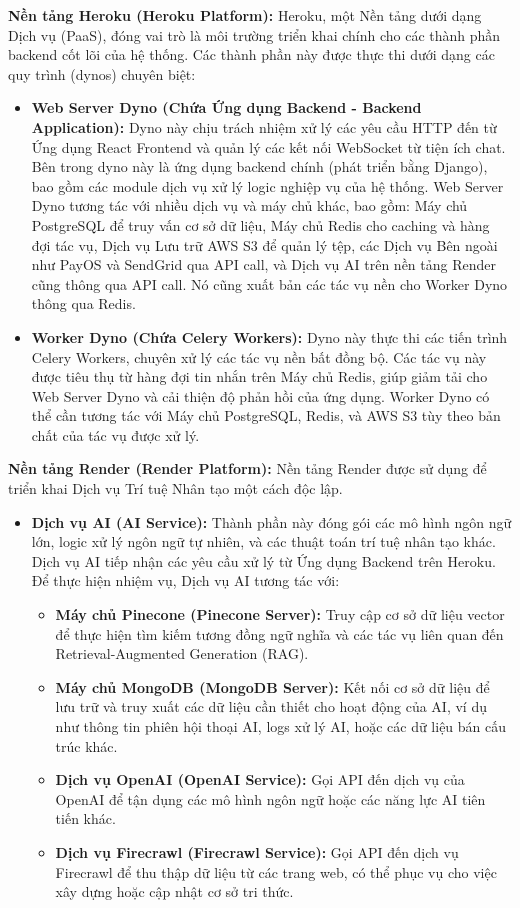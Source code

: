 \textbf{Nền tảng Heroku (Heroku Platform):} Heroku, một Nền tảng dưới dạng Dịch vụ (PaaS), đóng vai trò là môi trường triển khai chính cho các thành phần backend cốt lõi của hệ thống. Các thành phần này được thực thi dưới dạng các quy trình (dynos) chuyên biệt:
\begin{itemize}
    \item \textbf{Web Server Dyno (Chứa Ứng dụng Backend - Backend Application):} Dyno này chịu trách nhiệm xử lý các yêu cầu HTTP đến từ Ứng dụng React Frontend và quản lý các kết nối WebSocket từ tiện ích chat. Bên trong dyno này là ứng dụng backend chính (phát triển bằng Django), bao gồm các module dịch vụ xử lý logic nghiệp vụ của hệ thống. Web Server Dyno tương tác với nhiều dịch vụ và máy chủ khác, bao gồm: Máy chủ PostgreSQL để truy vấn cơ sở dữ liệu, Máy chủ Redis cho caching và hàng đợi tác vụ, Dịch vụ Lưu trữ AWS S3 để quản lý tệp, các Dịch vụ Bên ngoài như PayOS và SendGrid qua API call, và Dịch vụ AI trên nền tảng Render cũng thông qua API call. Nó cũng xuất bản các tác vụ nền cho Worker Dyno thông qua Redis.
    \item \textbf{Worker Dyno (Chứa Celery Workers):} Dyno này thực thi các tiến trình Celery Workers, chuyên xử lý các tác vụ nền bất đồng bộ. Các tác vụ này được tiêu thụ từ hàng đợi tin nhắn trên Máy chủ Redis, giúp giảm tải cho Web Server Dyno và cải thiện độ phản hồi của ứng dụng. Worker Dyno có thể cần tương tác với Máy chủ PostgreSQL, Redis, và AWS S3 tùy theo bản chất của tác vụ được xử lý.
\end{itemize}

\textbf{Nền tảng Render (Render Platform):} Nền tảng Render được sử dụng để triển khai Dịch vụ Trí tuệ Nhân tạo một cách độc lập.
\begin{itemize}
    \item \textbf{Dịch vụ AI (AI Service):} Thành phần này đóng gói các mô hình ngôn ngữ lớn, logic xử lý ngôn ngữ tự nhiên, và các thuật toán trí tuệ nhân tạo khác. Dịch vụ AI tiếp nhận các yêu cầu xử lý từ Ứng dụng Backend trên Heroku. Để thực hiện nhiệm vụ, Dịch vụ AI tương tác với:
        \begin{itemize}
            \item \textbf{Máy chủ Pinecone (Pinecone Server):} Truy cập cơ sở dữ liệu vector để thực hiện tìm kiếm tương đồng ngữ nghĩa và các tác vụ liên quan đến Retrieval-Augmented Generation (RAG).
            \item \textbf{Máy chủ MongoDB (MongoDB Server):} Kết nối cơ sở dữ liệu để lưu trữ và truy xuất các dữ liệu cần thiết cho hoạt động của AI, ví dụ như thông tin phiên hội thoại AI, logs xử lý AI, hoặc các dữ liệu bán cấu trúc khác.
            \item \textbf{Dịch vụ OpenAI (OpenAI Service):} Gọi API đến dịch vụ của OpenAI để tận dụng các mô hình ngôn ngữ hoặc các năng lực AI tiên tiến khác.
            \item \textbf{Dịch vụ Firecrawl (Firecrawl Service):} Gọi API đến dịch vụ Firecrawl để thu thập dữ liệu từ các trang web, có thể phục vụ cho việc xây dựng hoặc cập nhật cơ sở tri thức.
        \end{itemize}
\end{itemize}

